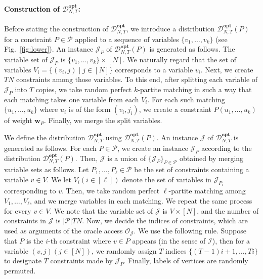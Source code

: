 \documentclass[letterpaper, 11pt]{article}
\newcommand{\calD}{\mathcal{D}}
\newcommand{\calI}{\mathcal{I}}
\newcommand{\calJ}{\mathcal{J}}
\newcommand{\calO}{\mathcal{O}}
\newcommand{\calP}{\mathcal{P}}
\newcommand{\biw}{\boldsymbol{w}}
\newcommand{\opt}{\mathbf{opt}}
\begin{document}
\paragraph{Construction of $\calD_{N,T}^{\opt}$:}
Before stating the construction of $\calD_{N,T}^{\opt}$,
we introduce a distribution $\calD_{N,T}^{\opt}(P)$ for a constraint $P\in \calP$ applied to a sequence of variables $\{v_1,\ldots,v_k\}$ (see Fig.~\ref{fig:lower}). 
An instance $\calJ_P$ of $\calD_{N,T}^{\opt}(P)$ is generated as follows.
The variable set of $\calJ_P$ is $\{v_1,\ldots,v_k\} \times [N]$.
We naturally regard that the set of variables $V_i = \{(v_i,j) \mid j\in [N]\}$ corresponds to a variable $v_i$.
Next, we create $TN$ constraints among those variables.
To this end, after splitting each variable of $\calJ_P$ into $T$ copies,
we take random perfect $k$-partite matching in such a way that each matching takes one variable from each $V_i$.
For each such matching $\{u_1,\ldots,u_k\}$ where $u_i$ is of the form $(v_i,j_i)$,
we create a constraint $P(u_1,\ldots,u_k)$ of weight $\biw_P$.
Finally, we merge the split variables.

We define the distribution $\calD_{N,T}^{\opt}$ using $\calD_{N,T}^{\opt}(P)$.
An instance $\calJ$ of $\calD_{N,T}^{\opt}$ is generated as follows.
For each $P\in \calP$,
we create an instance $\calJ_P$ according to the distribution $\calD_{N,T}^{\opt}(P)$.
Then, $\calJ$ is a union of $\{\calJ_P\}_{P\in \calP}$ obtained by merging variable sets as follows.
Let $P_1,\ldots,P_\ell \in \calP$ be the set of constraints containing a variable $v\in V$.
We let $V_i (i \in [\ell])$ denote the set of variables in $\calJ_{P_i}$ corresponding to $v$.
Then, we take random perfect $\ell$-partite matching among $V_1,\ldots,V_\ell$,
and we merge variables in each matching.
We repeat the same process for every $v\in V$.
We note that the variable set of $\calJ$ is $V\times [N]$,
and the number of constraints in $\calJ$ is $|\calP|TN$.
Now, we decide the indices of constraints, 
which are used as arguments of the oracle access $\calO_{\calJ}$.
We use the following rule.
Suppose that $P$ is the $i$-th constraint where $v\in P$ appears (in the sense of $\calI$),
then for a variable $(v,j) (j \in [N])$, 
we randomly assign $T$ indices $\{(T-1)i+1,\ldots,Ti\}$ to designate $T$ constraints made by $\calJ_P$.
Finally, labels of vertices are randomly permuted.
\end{document}
